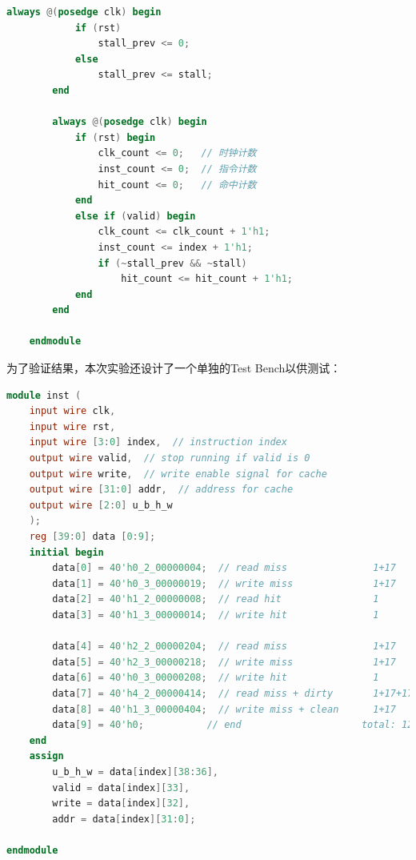 \begin{lstlisting}[language=Verilog]
        always @(posedge clk) begin
            if (rst)
                stall_prev <= 0;
            else
                stall_prev <= stall;
        end
        
        always @(posedge clk) begin
            if (rst) begin
                clk_count <= 0;   // 时钟计数
                inst_count <= 0;  // 指令计数
                hit_count <= 0;   // 命中计数
            end
            else if (valid) begin
                clk_count <= clk_count + 1'h1;
                inst_count <= index + 1'h1;
                if (~stall_prev && ~stall)
                    hit_count <= hit_count + 1'h1;
            end
        end
    
    endmodule    
\end{lstlisting}

为了验证结果，本次实验还设计了一个单独的Test Bench以供测试：
\begin{lstlisting}[language=verilog]
module inst (
    input wire clk,
    input wire rst,
    input wire [3:0] index,  // instruction index
    output wire valid,  // stop running if valid is 0
    output wire write,  // write enable signal for cache
    output wire [31:0] addr,  // address for cache
    output wire [2:0] u_b_h_w
    );
    reg [39:0] data [0:9];
    initial begin
        data[0] = 40'h0_2_00000004;  // read miss               1+17
        data[1] = 40'h0_3_00000019;  // write miss              1+17
        data[2] = 40'h1_2_00000008;  // read hit                1
        data[3] = 40'h1_3_00000014;  // write hit               1
        
        data[4] = 40'h2_2_00000204;  // read miss               1+17
        data[5] = 40'h2_3_00000218;  // write miss              1+17
        data[6] = 40'h0_3_00000208;  // write hit               1
        data[7] = 40'h4_2_00000414;  // read miss + dirty       1+17+17
        data[8] = 40'h1_3_00000404;  // write miss + clean      1+17
        data[9] = 40'h0;           // end                     total: 128
    end
    assign
        u_b_h_w = data[index][38:36],
        valid = data[index][33],
        write = data[index][32],
        addr = data[index][31:0];
        
endmodule
\end{lstlisting}

